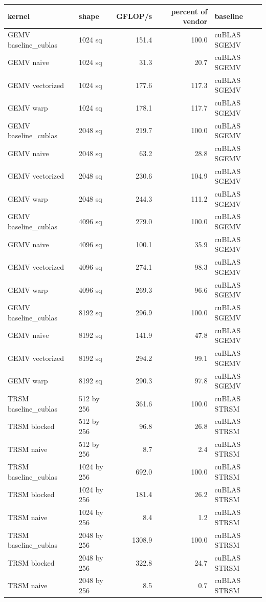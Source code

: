 \begin{tabular}{llrrl}
\toprule
kernel & shape & GFLOP/s & percent of vendor & baseline \\
\midrule
GEMV baseline\_cublas & 1024 sq & 151.4 & 100.0 & cuBLAS SGEMV \\
GEMV naive & 1024 sq & 31.3 & 20.7 & cuBLAS SGEMV \\
GEMV vectorized & 1024 sq & 177.6 & 117.3 & cuBLAS SGEMV \\
GEMV warp & 1024 sq & 178.1 & 117.7 & cuBLAS SGEMV \\
GEMV baseline\_cublas & 2048 sq & 219.7 & 100.0 & cuBLAS SGEMV \\
GEMV naive & 2048 sq & 63.2 & 28.8 & cuBLAS SGEMV \\
GEMV vectorized & 2048 sq & 230.6 & 104.9 & cuBLAS SGEMV \\
GEMV warp & 2048 sq & 244.3 & 111.2 & cuBLAS SGEMV \\
GEMV baseline\_cublas & 4096 sq & 279.0 & 100.0 & cuBLAS SGEMV \\
GEMV naive & 4096 sq & 100.1 & 35.9 & cuBLAS SGEMV \\
GEMV vectorized & 4096 sq & 274.1 & 98.3 & cuBLAS SGEMV \\
GEMV warp & 4096 sq & 269.3 & 96.6 & cuBLAS SGEMV \\
GEMV baseline\_cublas & 8192 sq & 296.9 & 100.0 & cuBLAS SGEMV \\
GEMV naive & 8192 sq & 141.9 & 47.8 & cuBLAS SGEMV \\
GEMV vectorized & 8192 sq & 294.2 & 99.1 & cuBLAS SGEMV \\
GEMV warp & 8192 sq & 290.3 & 97.8 & cuBLAS SGEMV \\
TRSM baseline\_cublas & 512 by 256 & 361.6 & 100.0 & cuBLAS STRSM \\
TRSM blocked & 512 by 256 & 96.8 & 26.8 & cuBLAS STRSM \\
TRSM naive & 512 by 256 & 8.7 & 2.4 & cuBLAS STRSM \\
TRSM baseline\_cublas & 1024 by 256 & 692.0 & 100.0 & cuBLAS STRSM \\
TRSM blocked & 1024 by 256 & 181.4 & 26.2 & cuBLAS STRSM \\
TRSM naive & 1024 by 256 & 8.4 & 1.2 & cuBLAS STRSM \\
TRSM baseline\_cublas & 2048 by 256 & 1308.9 & 100.0 & cuBLAS STRSM \\
TRSM blocked & 2048 by 256 & 322.8 & 24.7 & cuBLAS STRSM \\
TRSM naive & 2048 by 256 & 8.5 & 0.7 & cuBLAS STRSM \\
\bottomrule
\end{tabular}
